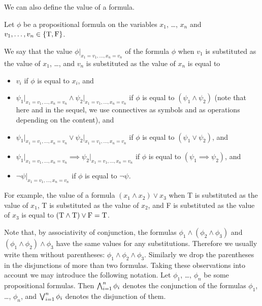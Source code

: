 We can also define the value of a formula.
\begin{definition}
  Let $\phi$ be a propositional formula on the variables $x_1$, \dots, $x_n$
  and $v_1, \dots, v_n \in \set{\ltrue, \lfalse}$.

  We say that the value $\phi\big\rvert_{x_1 = v_1, \dots, x_n = v_n}$ of the
  formula $\phi$ when $v_1$ is substituted as the value of $x_1$, \dots,
  and $v_n$  is substituted as the value of $x_n$ is equal to
  \begin{itemize}
    \item $v_i$ if $\phi$ is equal to $x_i$, and
    \item $\psi_1\big\rvert_{x_1 = v_1, \dots, x_n = v_n} \land
      \psi_2\big\rvert_{x_1 = v_1, \dots, x_n = v_n}$ if
      $\phi$ is equal to $(\psi_1 \land \psi_2)$ (note that here and in the
      sequel, we use connectives as symbols and as operations depending on
      the content), and
    \item $\psi_1\big\rvert_{x_1 = v_1, \dots, x_n = v_n} \lor
      \psi_2\big\rvert_{x_1 = v_1, \dots, x_n = v_n}$ if
      $\phi$ is equal to $(\psi_1 \lor \psi_2)$, and
    \item $\psi_1\big\rvert_{x_1 = v_1, \dots, x_n = v_n} \implies
      \psi_2\big\rvert_{x_1 = v_1, \dots, x_n = v_n}$ if
      $\phi$ is equal to $(\psi_1 \implies \psi_2)$, and
    \item $\lnot\psi\big\rvert_{x_1 = v_1, \dots, x_n = v_n}$
      if $\phi$ is equal to $\lnot \psi$.
  \end{itemize}
\end{definition}

For example, the value of a formula $(x_1 \land x_2) \lor x_3$ when T is
substituted as the value of $x_1$, T is substituted as the value of $x_2$,
and F is substituted as the value of $x_3$ is equal to
$(\text{T} \land \text{T}) \lor \text{F} = \text{T}$.

Note that, by associativity of conjunction, the formulas
$\phi_1 \land (\phi_2 \land \phi_3)$ and $(\phi_1 \land \phi_2) \land \phi_3$
have the same values for any substitutions. Therefore we usually write them
without parentheses: $\phi_1 \land \phi_2 \land \phi_3$. Similarly we drop the
parentheses in the disjunctions of more than two formulas. Taking these
observations into account we may introduce the following notation.
Let $\phi_1$, \dots, $\phi_n$ be some propositional formulas. Then
$\bigwedge_{i = 1}^n \phi_i$ denotes the conjunction of the formulas
$\phi_1$, \dots, $\phi_n$, and $\bigvee_{i = 1}^n \phi_i$
denotes the disjunction of them.


